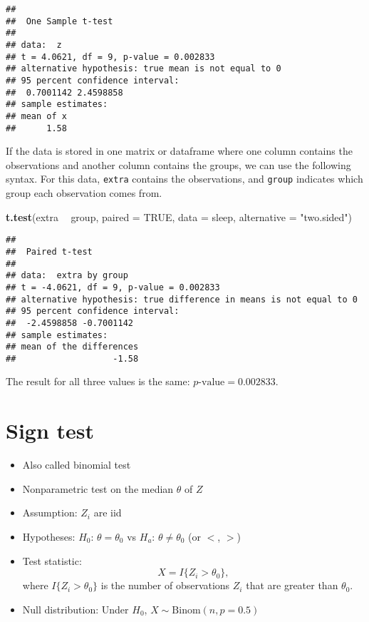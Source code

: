 \documentclass[
]{book}
\newenvironment{Shaded}{\begin{snugshade}}{\end{snugshade}}
\newcommand{\DataTypeTok}[1]{\textcolor[rgb]{0.13,0.29,0.53}{#1}}
\newcommand{\KeywordTok}[1]{\textcolor[rgb]{0.13,0.29,0.53}{\textbf{#1}}}
\newcommand{\NormalTok}[1]{#1}
\newcommand{\OperatorTok}[1]{\textcolor[rgb]{0.81,0.36,0.00}{\textbf{#1}}}
\newcommand{\OtherTok}[1]{\textcolor[rgb]{0.56,0.35,0.01}{#1}}
\newcommand{\StringTok}[1]{\textcolor[rgb]{0.31,0.60,0.02}{#1}}
\providecommand{\tightlist}{%
  \setlength{\itemsep}{0pt}\setlength{\parskip}{0pt}}
\begin{document}
\begin{verbatim}
## 
##  One Sample t-test
## 
## data:  z
## t = 4.0621, df = 9, p-value = 0.002833
## alternative hypothesis: true mean is not equal to 0
## 95 percent confidence interval:
##  0.7001142 2.4598858
## sample estimates:
## mean of x 
##      1.58
\end{verbatim}

If the data is stored in one matrix or dataframe
where one column contains the observations and another column contains the groups,
we can use the following syntax.
For this data, \texttt{extra} contains the observations, and \texttt{group} indicates
which group each observation comes from.

\begin{Shaded}
\begin{Highlighting}[]
\KeywordTok{t.test}\NormalTok{(extra }\OperatorTok{~}\StringTok{ }\NormalTok{group, }\DataTypeTok{paired =} \OtherTok{TRUE}\NormalTok{, }\DataTypeTok{data =}\NormalTok{ sleep, }\DataTypeTok{alternative =} \StringTok{"two.sided"}\NormalTok{)}
\end{Highlighting}
\end{Shaded}

\begin{verbatim}
## 
##  Paired t-test
## 
## data:  extra by group
## t = -4.0621, df = 9, p-value = 0.002833
## alternative hypothesis: true difference in means is not equal to 0
## 95 percent confidence interval:
##  -2.4598858 -0.7001142
## sample estimates:
## mean of the differences 
##                   -1.58
\end{verbatim}

The result for all three values is the same:
\(p\text{-value} = 0.002833\).

\hypertarget{sign-test}{%
\section{Sign test}\label{sign-test}}

\begin{itemize}
\tightlist
\item
  Also called binomial test
\item
  Nonparametric test on the median \(\theta\) of \(Z\)
\item
  Assumption: \(Z_i\) are iid
\item
  Hypotheses: \(H_0\): \(\theta = \theta_0\) vs \(H_a\): \(\theta \neq \theta_0\) (or \(<\), \(>\))
\item
  Test statistic: \[X = I\{Z_i > \theta_0\},\]
  where \(I\{Z_i > \theta_0\}\) is the number of observations \(Z_i\) that are greater than \(\theta_0\).
\item
  Null distribution: Under \(H_0\), \(X \sim \mathrm{Binom}(n, p = 0.5)\)
\end{itemize}
\end{document}
